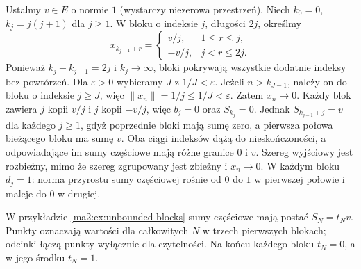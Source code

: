 \begin{przyklad}
\label{ma2:ex:unbounded-blocks}
Ustalmy $v\in E$ o normie $1$ (wystarczy niezerowa przestrzeń).
Niech $k_0=0$, $k_j=j(j+1)$ dla $j\ge1$.
W bloku o indeksie $j$, długości $2j$, określmy
\[
 x_{k_{j-1}+r}=
 \begin{cases}
 v/j,&1\le r\le j,\\
 -v/j,&j<r\le 2j.
 \end{cases}
\]
Ponieważ $k_j-k_{j-1}=2j$ i $k_j\to\infty$, bloki
pokrywają wszystkie dodatnie indeksy bez powtórzeń.
Dla $\varepsilon>0$ wybieramy $J$ z $1/J<\varepsilon$.
Jeżeli $n>k_{J-1}$, należy on do bloku o indeksie $j\ge J$,
więc $\|x_n\|=1/j\le1/J<\varepsilon$.
Zatem $x_n\to0$. Każdy blok zawiera $j$ kopii $v/j$ i $j$
kopii $-v/j$, więc $b_j=0$ oraz $S_{k_j}=0$.
Jednak $S_{k_{j-1}+j}=v$ dla każdego $j\ge1$, gdyż
poprzednie bloki mają sumę zero, a pierwsza połowa
bieżącego bloku ma sumę $v$. Oba ciągi indeksów dążą
do nieskończoności, a odpowiadające im sumy częściowe
mają różne granice $0$ i $v$. Szereg wyjściowy jest
rozbieżny, mimo że szereg zgrupowany jest zbieżny i $x_n\to0$.
W każdym bloku $d_j=1$: norma przyrostu sumy częściowej
rośnie od $0$ do $1$ w pierwszej połowie i maleje do $0$
w drugiej.
\end{przyklad}
\begin{center}

\small W przykładzie \ref{ma2:ex:unbounded-blocks} sumy częściowe
mają postać $S_N=t_Nv$. Punkty oznaczają wartości dla
całkowitych $N$ w trzech pierwszych blokach; odcinki łączą
punkty wyłącznie dla czytelności. Na końcu każdego bloku
$t_N=0$, a w jego środku $t_N=1$.
\end{center}

